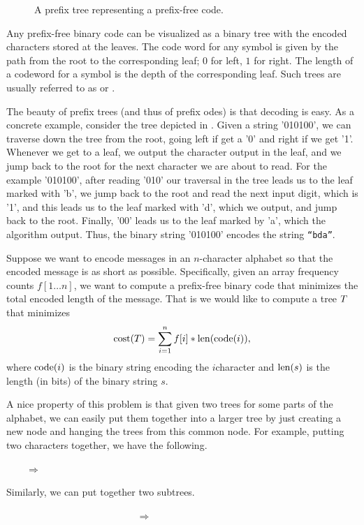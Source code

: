 \begin{figure}[t]
    \centering
    \caption{A prefix tree representing a prefix-free code.}
\end{figure}

Any prefix-free binary code can be visualized as a binary tree with
the encoded characters stored at the leaves. The code word for any
symbol is given by the path from the root to the corresponding leaf;
$0$ for left, $1$ for right. The {length} of a codeword for a symbol
is the depth of the corresponding leaf. Such trees are usually
referred to as  or .



The beauty of prefix trees (and thus of prefix odes) is that decoding
is easy.  As a concrete example, consider the tree depicted in
. Given
a string '010100', we can traverse down the tree from the root, going
left if get a '0' and right if we get '1'. Whenever we get to a leaf,
we output the character output in the leaf, and we jump back to the
root for the next character we are about to read. For the example
'010100', after reading '010' our traversal in the tree leads us to
the leaf marked with 'b', we jump back to the root and read the next
input digit, which is '1', and this leads us to the leaf marked with
'd', which we output, and jump back to the root. Finally, '00' leads
us to the leaf marked by 'a', which the algorithm output. Thus, the
binary string '010100' encodes the string \texttt{``b{}d{}a''}.


Suppose we want to encode messages in an $n$-character alphabet so
that the encoded message is as short as possible. Specifically, given
an array frequency counts $f[1 \ldots n]$, we want to compute a
prefix-free binary code that minimizes the total encoded length of the
message. That is we would like to compute a tree $T$ that
minimizes
\begin{align}
    \costX{\Tree} = 
    \sum_{i=1}^n f[i] * \lengthX{ \codeX{i}}, %
    \eqlab{compressor}
\end{align}
where $\codeX{i}$ is the binary string encoding the $i$\th character
and $\lengthX{s}$ is the length (in bits) of the binary string $s$.


A nice property of this problem is that given two trees for some parts
of the alphabet, we can easily put them together into a larger tree by
just creating a new node and hanging the trees from this common
node. For example, putting two characters together, we have the following.
\begin{center}
      
    ~~~~$\Rightarrow$~~~~
\end{center}
Similarly, we can put together two subtrees.
\begin{center}
    ~~~~~~~~~~~~~~~~~~~~~~
    \TreePKGtriangle[A]{1cm}{1cm}    
    \TreePKGtriangle[B]{1cm}{1cm}    
    ~~~~$\Rightarrow$~~~~
    \tree{\TreePKGtriangle[A]{1cm}{1cm}    }{
    \TreePKGtriangle[B]{1cm}{1cm}    }
\end{center}

